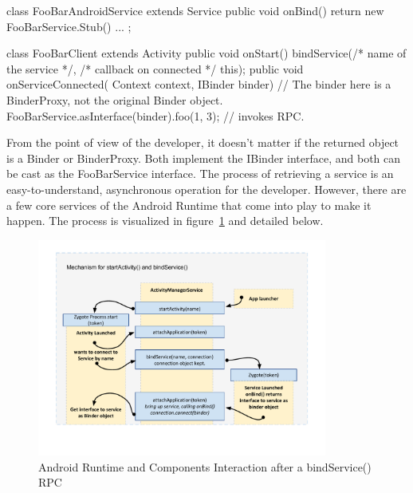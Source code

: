\documentclass[prodmode]{acmlarge}
\begin{document}
\begin{snippet}
class FooBarAndroidService extends Service {
  public void onBind() { return new FooBarService.Stub() { ... }; }
}

class FooBarClient extends Activity {
  public void onStart() { bindService(/* name of the service */,
                                      /* callback on connected */ this);
  }
  public void onServiceConnected(
    Context context, IBinder binder) {
    // The binder here is a BinderProxy, not the original Binder object.
    FooBarService.asInterface(binder).foo(1, 3);  // invokes RPC.
  }
}
\end{snippet}

From the point of view of the developer, it doesn't matter if the returned object is a Binder or BinderProxy. Both implement the IBinder interface, and both can be cast as the FooBarService interface. The process of retrieving a service is an easy-to-understand, asynchronous operation for the developer. However, there are a few core services of the Android Runtime that come into play to make it happen. The process is visualized in figure~\ref{fig:BindService} and detailed below.

\begin{figure}[h]
\centering
\includegraphics[width=0.85\textwidth]{drawings/bindService.pdf}
\caption{Android Runtime and Components Interaction after a bindService() RPC}
\label{fig:BindService}
\end{figure}
\end{document}
